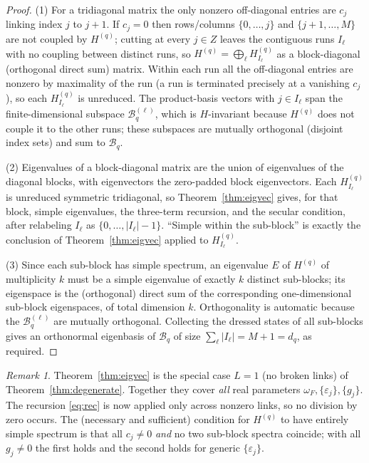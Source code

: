 \documentclass[12pt]{article}
\theoremstyle{definition}
\theoremstyle{remark}
\newtheorem{remark}{Remark}
\begin{document}
\begin{proof}
(1) For a tridiagonal matrix the only nonzero off-diagonal entries are $c_j$ linking
index $j$ to $j+1$. If $c_j=0$ then rows/columns $\{0,\dots,j\}$ and
$\{j+1,\dots,M\}$ are not coupled by $H^{(q)}$; cutting at every $j\in Z$ leaves the
contiguous runs $I_\ell$ with no coupling between distinct runs, so
$H^{(q)}=\bigoplus_\ell H^{(q)}_{I_\ell}$ as a block-diagonal (orthogonal direct sum)
matrix. Within each run all the off-diagonal entries are nonzero by maximality of the
run (a run is terminated precisely at a vanishing $c_j$), so each $H^{(q)}_{I_\ell}$
is unreduced. The product-basis vectors with $j\in I_\ell$ span the
finite-dimensional subspace $\mathcal B_q^{(\ell)}$, which is $H$-invariant because
$H^{(q)}$ does not couple it to the other runs; these subspaces are mutually
orthogonal (disjoint index sets) and sum to $\mathcal B_q$.

(2) Eigenvalues of a block-diagonal matrix are the union of eigenvalues of the
diagonal blocks, with eigenvectors the zero-padded block eigenvectors. Each
$H^{(q)}_{I_\ell}$ is unreduced symmetric tridiagonal, so Theorem~\ref{thm:eigvec}
gives, for that block, simple eigenvalues, the three-term recursion, and the secular
condition, after relabeling $I_\ell$ as $\{0,\dots,|I_\ell|-1\}$. ``Simple within the
sub-block'' is exactly the conclusion of Theorem~\ref{thm:eigvec} applied to
$H^{(q)}_{I_\ell}$.

(3) Since each sub-block has simple spectrum, an eigenvalue $E$ of $H^{(q)}$ of
multiplicity $k$ must be a simple eigenvalue of exactly $k$ distinct sub-blocks; its
eigenspace is the (orthogonal) direct sum of the corresponding one-dimensional
sub-block eigenspaces, of total dimension $k$. Orthogonality is automatic because the
$\mathcal B_q^{(\ell)}$ are mutually orthogonal. Collecting the dressed states of all
sub-blocks gives an orthonormal eigenbasis of $\mathcal B_q$ of size
$\sum_\ell|I_\ell|=M+1=d_q$, as required.
\end{proof}

\begin{remark}
Theorem~\ref{thm:eigvec} is the special case $L=1$ (no broken links) of
Theorem~\ref{thm:degenerate}. Together they cover \emph{all} real parameters
$\omega_F,\{\varepsilon_j\},\{g_j\}$. The recursion \eqref{eq:rec} is now applied
only across nonzero links, so no division by zero occurs. The (necessary and
sufficient) condition for $H^{(q)}$ to have entirely simple spectrum is that all
$c_j\ne0$ \emph{and} no two sub-block spectra coincide; with all $g_j\ne0$ the first
holds and the second holds for generic $\{\varepsilon_j\}$.
\end{remark}
\end{document}
